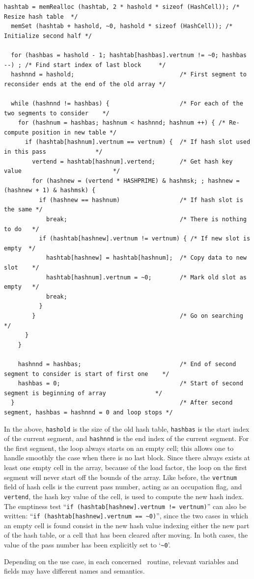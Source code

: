 \begin{lstlisting}[style=language-c]
  hashtab = memRealloc (hashtab, 2 * hashold * sizeof (HashCell)); /* Resize hash table  */
  memSet (hashtab + hashold, ~0, hashold * sizeof (HashCell)); /* Initialize second half */

  for (hashbas = hashold - 1; hashtab[hashbas].vertnum != ~0; hashbas --) ; /* Find start index of last block     */
  hashnnd = hashold;                              /* First segment to reconsider ends at the end of the old array */

  while (hashnnd != hashbas) {                    /* For each of the two segments to consider    */
    for (hashnum = hashbas; hashnum < hashnnd; hashnum ++) { /* Re-compute position in new table */
      if (hashtab[hashnum].vertnum == vertnum) {  /* If hash slot used in this pass              */
        vertend = hashtab[hashnum].vertend;       /* Get hash key value                          */
        for (hashnew = (vertend * HASHPRIME) & hashmsk; ; hashnew = (hashnew + 1) & hashmsk) {
          if (hashnew == hashnum)                 /* If hash slot is the same */
            break;                                /* There is nothing to do   */
          if (hashtab[hashnew].vertnum != vertnum) { /* If new slot is empty  */
            hashtab[hashnew] = hashtab[hashnum];  /* Copy data to new slot    */
            hashtab[hashnum].vertnum = ~0;        /* Mark old slot as empty   */
            break;
          }
        }                                         /* Go on searching */
      }
    }

    hashnnd = hashbas;                            /* End of second segment to consider is start of first one    */
    hashbas = 0;                                  /* Start of second segment is beginning of array              */
  }                                               /* After second segment, hashbas = hashnnd = 0 and loop stops */
\end{lstlisting}

In the above, \texttt{hashold} is the size of the old hash table,
\texttt{hashbas} is the start index of the current segment, and
\texttt{hashnnd} is the end index of the current segment. For the
first segment, the loop always starts on an empty cell; this allows
one to handle smoothly the case when there is no last block. Since
there always exists at least one empty cell in the array, because of
the load factor, the loop on the first segment will never start off
the bounds of the array. Like before, the \texttt{vertnum} field of
hash cells is the current pass number, acting as an occupation flag,
and \texttt{vertend}, the hash key value of the cell, is used to
compute the new hash index. The emptiness test ``\texttt{if
(hashtab[hashnew].vertnum != vertnum)}'' can also be written:
``\texttt{if (hashtab[hashnew].vertnum == \~{}0)}'', since the two
cases in which an empty cell is found consist in the new hash value
indexing either the new part of the hash table, or a cell that has been
cleared after moving. In both cases, the value of the pass number has
been explicitly set to `\texttt{\~{}0}'.

Depending on the use case, in each concerned \scotch\ routine,
relevant variables and fields may have different names and semantics.

